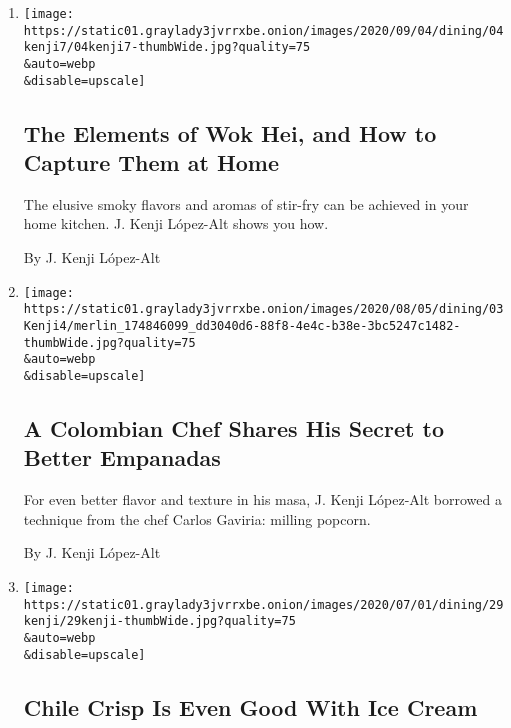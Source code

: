 \begin{enumerate}
\def\labelenumi{\arabic{enumi}.}
\item
  \href{/2020/09/04/dining/stir-fry-recipe-wok-hei.html}{}

  \texttt{[image: https://static01.graylady3jvrrxbe.onion/images/2020/09/04/dining/04kenji7/04kenji7-thumbWide.jpg?quality=75\\\&auto=webp\\\&disable=upscale]}

  \hypertarget{the-elements-of-wok-hei-and-how-to-capture-them-at-home}{%
  \subsection{The Elements of Wok Hei, and How to Capture Them at
  Home}\label{the-elements-of-wok-hei-and-how-to-capture-them-at-home}}

  The elusive smoky flavors and aromas of stir-fry can be achieved in
  your home kitchen. J. Kenji López-Alt shows you how.

  By J. Kenji López-Alt
\item
  \href{/2020/08/04/dining/colombian-empanadas-carlos-gaviria.html}{}

  \texttt{[image: https://static01.graylady3jvrrxbe.onion/images/2020/08/05/dining/03Kenji4/merlin\_174846099\_dd3040d6-88f8-4e4c-b38e-3bc5247c1482-thumbWide.jpg?quality=75\\\&auto=webp\\\&disable=upscale]}

  \hypertarget{a-colombian-chef-shares-his-secret-to-better-empanadas}{%
  \subsection{A Colombian Chef Shares His Secret to Better
  Empanadas}\label{a-colombian-chef-shares-his-secret-to-better-empanadas}}

  For even better flavor and texture in his masa, J. Kenji López-Alt
  borrowed a technique from the chef Carlos Gaviria: milling popcorn.

  By J. Kenji López-Alt
\item
  \href{/2020/06/30/dining/chili-crisp-ice-cream-sundae.html}{}

  \texttt{[image: https://static01.graylady3jvrrxbe.onion/images/2020/07/01/dining/29kenji/29kenji-thumbWide.jpg?quality=75\\\&auto=webp\\\&disable=upscale]}

  \hypertarget{chile-crisp-is-even-good-with-ice-cream}{%
  \subsection{Chile Crisp Is Even Good With Ice
  Cream}\label{chile-crisp-is-even-good-with-ice-cream}}


\end{enumerate}
